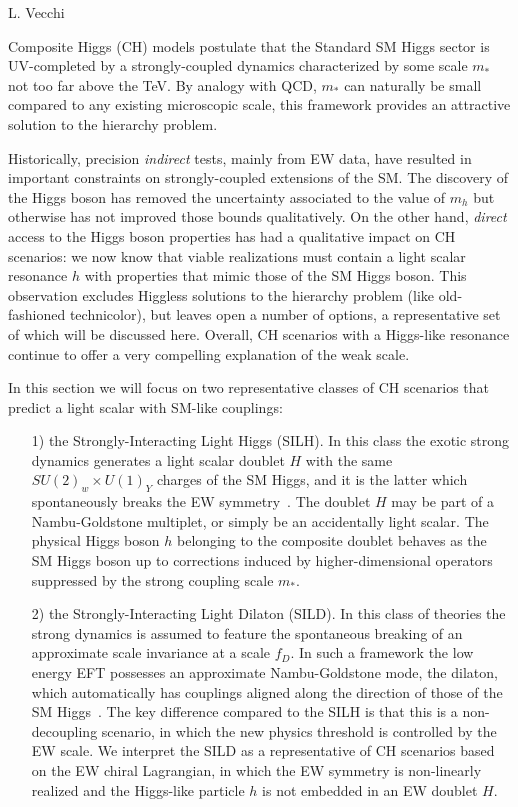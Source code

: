 \begin{center}
 {L. Vecchi}
\end{center}
\label{sec9:CHM}

Composite Higgs (CH) models postulate that the Standard SM Higgs sector is UV-completed by a strongly-coupled dynamics characterized by some scale $m_*$ not too far above the TeV. By analogy with QCD, $m_*$ can naturally be small compared to any existing microscopic scale, this framework provides an attractive solution to the hierarchy problem. 

Historically, precision {\emph{indirect}} tests, mainly from EW data, have resulted in important constraints on strongly-coupled extensions of the SM. The discovery of the Higgs boson has removed the uncertainty associated to the value of $m_h$ but otherwise has not improved those bounds qualitatively. On the other hand, {\emph{direct}} access to the Higgs boson properties has had a qualitative impact on CH scenarios: we now know that viable realizations must contain a light scalar resonance $h$ with properties that mimic those of the SM Higgs boson. This observation excludes Higgless solutions to the hierarchy problem (like old-fashioned technicolor), but leaves open a number of options, a representative set of which will be discussed here. Overall, CH scenarios with a Higgs-like resonance continue to offer a very compelling explanation of the weak scale.




In this section we will focus on two representative classes of CH scenarios that predict a light scalar with SM-like couplings:
\begin{itemize}
\item[1)] the Strongly-Interacting Light Higgs (SILH). In this class the exotic strong dynamics generates a light scalar doublet $H$ with the same $SU(2)_w\times U(1)_Y$ charges of the SM Higgs, and it is the latter which spontaneously breaks the EW symmetry~\cite{Kaplan:1983fs, Kaplan:1983sm}. The doublet $H$ may be part of a Nambu-Goldstone multiplet, or simply be an accidentally light scalar. The physical Higgs boson $h$ belonging to the composite doublet behaves as the SM Higgs boson up to corrections induced by higher-dimensional operators suppressed by the strong coupling scale $m_*$. 
\item[2)] the Strongly-Interacting Light Dilaton (SILD). In this class of theories the strong dynamics is assumed to feature the spontaneous breaking of an approximate scale invariance at a scale $f_D$. In such a framework the low energy EFT possesses an approximate Nambu-Goldstone mode, the dilaton, which automatically has couplings aligned along the direction of those of the SM Higgs~\cite{Goldberger:2008zz}. The key difference compared to the SILH is that this is a non-decoupling scenario, in which the new physics threshold is controlled by the EW scale. We interpret the SILD as a representative of CH scenarios based on the EW chiral Lagrangian, in which the EW symmetry is non-linearly realized and the Higgs-like particle $h$ is not embedded in an EW doublet $H$. 
\end{itemize}



